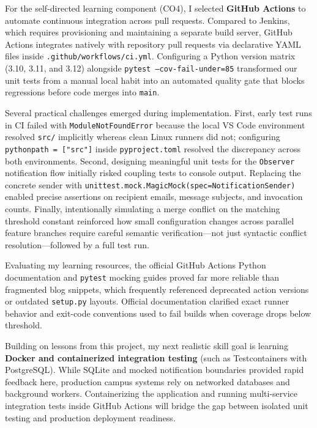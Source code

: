 \documentclass[12pt,a4paper]{article}
\begin{document}
For the self-directed learning component (CO4), I selected \textbf{GitHub Actions} to automate continuous integration across pull requests. Compared to Jenkins, which requires provisioning and maintaining a separate build server, GitHub Actions integrates natively with repository pull requests via declarative YAML files inside \texttt{.github/workflows/ci.yml}. Configuring a Python version matrix (3.10, 3.11, and 3.12) alongside \texttt{pytest --cov-fail-under=85} transformed our unit tests from a manual local habit into an automated quality gate that blocks regressions before code merges into \texttt{main}.

Several practical challenges emerged during implementation. First, early test runs in CI failed with \texttt{ModuleNotFoundError} because the local VS Code environment resolved \texttt{src/} implicitly whereas clean Linux runners did not; configuring \texttt{pythonpath = ["src"]} inside \texttt{pyproject.toml} resolved the discrepancy across both environments. Second, designing meaningful unit tests for the \texttt{Observer} notification flow initially risked coupling tests to console output. Replacing the concrete sender with \texttt{unittest.mock.MagicMock(spec=NotificationSender)} enabled precise assertions on recipient emails, message subjects, and invocation counts. Finally, intentionally simulating a merge conflict on the matching threshold constant reinforced how small configuration changes across parallel feature branches require careful semantic verification—not just syntactic conflict resolution—followed by a full test run.

Evaluating my learning resources, the official GitHub Actions Python documentation and \texttt{pytest} mocking guides proved far more reliable than fragmented blog snippets, which frequently referenced deprecated action versions or outdated \texttt{setup.py} layouts. Official documentation clarified exact runner behavior and exit-code conventions used to fail builds when coverage drops below threshold.

Building on lessons from this project, my next realistic skill goal is learning \textbf{Docker and containerized integration testing} (such as Testcontainers with PostgreSQL). While SQLite and mocked notification boundaries provided rapid feedback here, production campus systems rely on networked databases and background workers. Containerizing the application and running multi-service integration tests inside GitHub Actions will bridge the gap between isolated unit testing and production deployment readiness.
\end{document}
